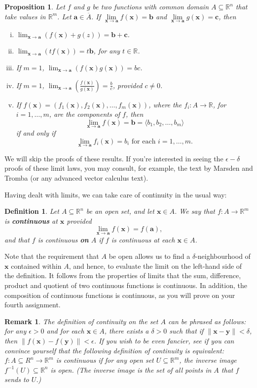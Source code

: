 \documentclass[12pt,letterpaper]{article}
\newtheorem{rem}[theorem]{Remark}
\newenvironment{remark}{\begin{rem}\rm}{\end{rem}}
\newtheorem{proposition}[theorem]{Proposition}
\newtheorem{definition}[theorem]{Definition}
\newcommand{\R}{\mathbb{R}}
\newcommand{\len}[1]{\lVert#1\rVert}
\newcommand{\di}{\displaystyle}
\newcommand{\x}{\mathbf{x}}
\newcommand{\y}{\mathbf{y}}
\begin{document}
\begin{proposition}
 Let $f$ and $g$ be two functions with common domain $A\subseteq\R^n$ that take values in $\R^m$. Let $\mathbf{a}\in\overline{A}$. If $\lim\limits_{\x\to \mathbf{a}}f(\x)=\mathbf{b}$ and $\lim\limits_{\x\to \mathbf{a}}g(\x) = \mathbf{c}$, then
\begin{enumerate}[(i)]
 \item $\di \lim_{\x\to \mathbf{a}}(f(\x)+g(z)) = \mathbf{b}+\mathbf{c}$.
 \item $\di \lim_{\x\to \mathbf{a}}(tf(\x)) = t\mathbf{b}$, for any $t\in\R$.
 \item If $m=1$, $\di \lim_{\x\to \mathbf{a}}(f(\x)g(\x)) = bc$.
 \item If $m=1$, $\di \lim_{\x\to \mathbf{a}}\left(\frac{f(\x)}{g(\x)}\right) = \frac{b}{c}$, provided $c\neq 0$.
 \item If $f(\x) = (f_1(\x),f_2(\x),\ldots, f_m(\x))$, where the $f_i:A\to \R$, for $i=1,\ldots, m$, are the components of $f$, then
 \[
 \lim_{\x\to\mathbf{a}}f(\x) = \mathbf{b} = \langle b_1,b_2,\ldots, b_m\rangle
 \]
 if and only if
 \[
 \lim_{\x\to\mathbf{a}}f_i(\x) = b_i \text{ for each } i=1,\ldots, m.
 \]
\end{enumerate}
\end{proposition}
We will skip the proofs of these results. If you're interested in seeing the $\epsilon-\delta$ proofs of these limit laws, you may consult, for example, the text by Marsden and Tromba (or any advanced vector calculus text).

Having dealt with limits, we can take care of continuity in the usual way:
\begin{definition}
 Let $A\subseteq \R^n$ be an open set, and let $\x\in A$.  We say that $f:A\to\R^m$ is {\bf continuous} at $\x$ provided
\[
 \lim_{\x\to \mathbf{a}}f(\x) = f(\mathbf{a}),
\]
and that $f$ is continuous {\bf on} $A$ if $f$ is continuous at each $\x\in A$.
\end{definition}
Note that the requirement that $A$ be open allows us to find a $\delta$-neighbourhood of $\x$ contained within $A$, and hence, to evaluate the limit on the left-hand side of the definition.  It follows from the properties of limits that the sum, difference, product and quotient of two continuous functions is continuous.  In addition, the composition of continuous functions is continuous, as you will prove on your fourth assignment.
\begin{remark}
 The definition of continuity {\em on the set} $A$ can be phrased as follows: for any $\epsilon>0$ and for each $\x\in A$, there exists a $\delta>0$ such that if $\len{\x-\y}<\delta$, then $\len{f(\x)-f(\y)}<\epsilon$.  If you wish to be even fancier, see if you can convince yourself that the following definition of continuity is equivalent: $f:A\subseteq R^n\to\R^m$ is continuous if for any open set $U\subseteq\R^m$, the inverse image $f^{-1}(U)\subseteq \R^n$ is open. (The inverse image is the set of all points in $A$ that $f$ sends to $U$.)
\end{remark}
\end{document}
